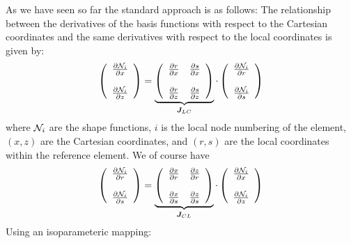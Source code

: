 As we have seen so far the standard approach is as follows:
The relationship between the derivatives of the basis functions with respect to the Cartesian coordinates and the same 
derivatives with respect to the local coordinates is given by:
\[
\left(
\begin{array}{c}
\frac{\partial {\mathcal{N}}_i}{\partial x} \\ \\
\frac{\partial {\mathcal{N}}_i}{\partial z} 
\end{array}
\right)
= 
\underbrace{\left(
\begin{array}{cc}
\frac{\partial r}{\partial x}  & 
\frac{\partial s}{\partial x}   \\ \\
\frac{\partial r}{\partial z}  & 
\frac{\partial s}{\partial z}  
\end{array}
\right)}_{{\bm J}_{LC}}
\cdot
\left(
\begin{array}{c}
\frac{\partial {\mathcal{N}}_i}{\partial r} \\ \\
\frac{\partial {\mathcal{N}}_i}{\partial s} 
\end{array}
\right)
\]
where ${\mathcal{N}}_i$ are the shape functions, $i$ is the local node numbering of the element, 
$(x,z)$ are the Cartesian coordinates, and $(r,s)$ are the local coordinates within the reference element.
We of course have
\[
\left(
\begin{array}{c}
\frac{\partial {\mathcal{N}}_i}{\partial r} \\ \\
\frac{\partial {\mathcal{N}}_i}{\partial s} 
\end{array}
\right)
= 
\underbrace{\left(
\begin{array}{cc}
\frac{\partial x}{\partial r}  & 
\frac{\partial z}{\partial r}   \\ \\
\frac{\partial x}{\partial s}  & 
\frac{\partial z}{\partial s}  
\end{array}
\right)}_{{\bm J}_{CL}}
\cdot
\left(
\begin{array}{c}
\frac{\partial {\mathcal{N}}_i}{\partial x} \\ \\
\frac{\partial {\mathcal{N}}_i}{\partial z} 
\end{array}
\right)
\]
Using an isoparameteric mapping:
